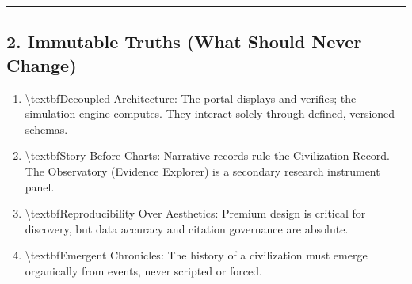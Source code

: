 \documentclass[11pt,a4paper]{article}
\begin{document}
\noindent\rule{\textwidth}{0.4pt}

\subsection*{2. Immutable Truths (What Should Never Change)}

\begin{enumerate}
  \item \textbackslash{}textbf{Decoupled Architecture}: The portal displays and verifies; the simulation engine computes. They interact solely through defined, versioned schemas.
  \item \textbackslash{}textbf{Story Before Charts}: Narrative records rule the Civilization Record. The Observatory (Evidence Explorer) is a secondary research instrument panel.
  \item \textbackslash{}textbf{Reproducibility Over Aesthetics}: Premium design is critical for discovery, but data accuracy and citation governance are absolute.
  \item \textbackslash{}textbf{Emergent Chronicles}: The history of a civilization must emerge organically from events, never scripted or forced.
\end{enumerate}
\end{document}
